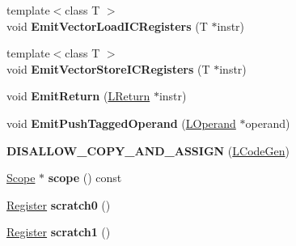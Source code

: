\begin{DoxyCompactItemize}
\item 
{\footnotesize template$<$class T $>$ }\\void {\bfseries Emit\+Vector\+Load\+I\+C\+Registers} (T $\ast$instr)\hypertarget{classv8_1_1internal_1_1_l_code_gen_a31e396d22475d9c9dec1ac0e5030380a}{}\label{classv8_1_1internal_1_1_l_code_gen_a31e396d22475d9c9dec1ac0e5030380a}

\item 
{\footnotesize template$<$class T $>$ }\\void {\bfseries Emit\+Vector\+Store\+I\+C\+Registers} (T $\ast$instr)\hypertarget{classv8_1_1internal_1_1_l_code_gen_a84c9b0e87f89361233a5c74e43d689cb}{}\label{classv8_1_1internal_1_1_l_code_gen_a84c9b0e87f89361233a5c74e43d689cb}

\item 
void {\bfseries Emit\+Return} (\hyperlink{classv8_1_1internal_1_1_l_return}{L\+Return} $\ast$instr)\hypertarget{classv8_1_1internal_1_1_l_code_gen_ae85b89dbfcf7c96446779404dd6aa10e}{}\label{classv8_1_1internal_1_1_l_code_gen_ae85b89dbfcf7c96446779404dd6aa10e}

\item 
void {\bfseries Emit\+Push\+Tagged\+Operand} (\hyperlink{classv8_1_1internal_1_1_l_operand}{L\+Operand} $\ast$operand)\hypertarget{classv8_1_1internal_1_1_l_code_gen_a4c74d29dbe6012e87243f65b8a94b4e5}{}\label{classv8_1_1internal_1_1_l_code_gen_a4c74d29dbe6012e87243f65b8a94b4e5}

\item 
{\bfseries D\+I\+S\+A\+L\+L\+O\+W\+\_\+\+C\+O\+P\+Y\+\_\+\+A\+N\+D\+\_\+\+A\+S\+S\+I\+GN} (\hyperlink{classv8_1_1internal_1_1_l_code_gen}{L\+Code\+Gen})\hypertarget{classv8_1_1internal_1_1_l_code_gen_a475eb7b3d7738263ae865905cf36b985}{}\label{classv8_1_1internal_1_1_l_code_gen_a475eb7b3d7738263ae865905cf36b985}

\item 
\hyperlink{classv8_1_1internal_1_1_scope}{Scope} $\ast$ {\bfseries scope} () const \hypertarget{classv8_1_1internal_1_1_l_code_gen_a2b85c964ccc4e59f50d49d19b0ed5ce0}{}\label{classv8_1_1internal_1_1_l_code_gen_a2b85c964ccc4e59f50d49d19b0ed5ce0}

\item 
\hyperlink{structv8_1_1internal_1_1_register}{Register} {\bfseries scratch0} ()\hypertarget{classv8_1_1internal_1_1_l_code_gen_a9ebee5eebe5fb0c13a6830fc3a0d96d5}{}\label{classv8_1_1internal_1_1_l_code_gen_a9ebee5eebe5fb0c13a6830fc3a0d96d5}

\item 
\hyperlink{structv8_1_1internal_1_1_register}{Register} {\bfseries scratch1} ()\hypertarget{classv8_1_1internal_1_1_l_code_gen_a157c35c333279efe87b7fcd036dd531d}{}\label{classv8_1_1internal_1_1_l_code_gen_a157c35c333279efe87b7fcd036dd531d}


\end{DoxyCompactItemize}
